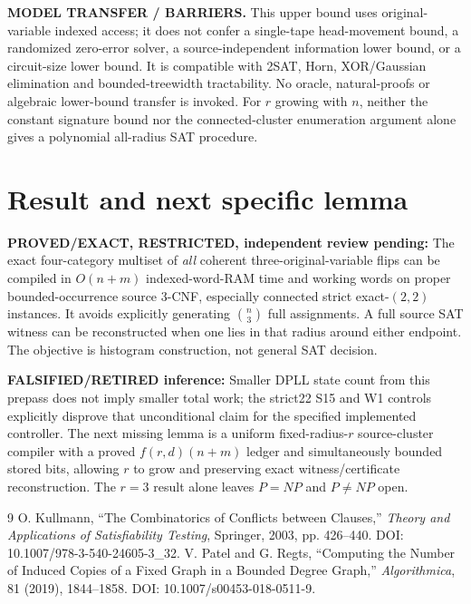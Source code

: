 \documentclass[11pt]{article}
\begin{document}
\noindent\textbf{MODEL TRANSFER / BARRIERS.} This upper bound uses original-variable indexed access; it does not confer a single-tape head-movement bound, a randomized zero-error solver, a source-independent information lower bound, or a circuit-size lower bound. It is compatible with 2SAT, Horn, XOR/Gaussian elimination and bounded-treewidth tractability. No oracle, natural-proofs or algebraic lower-bound transfer is invoked. For $r$ growing with $n$, neither the constant signature bound nor the connected-cluster enumeration argument alone gives a polynomial all-radius SAT procedure.

\section{Result and next specific lemma}
\noindent\textbf{PROVED/EXACT, RESTRICTED, independent review pending:} The exact four-category multiset of \emph{all} coherent three-original-variable flips can be compiled in $O(n+m)$ indexed-word-RAM time and working words on proper bounded-occurrence source 3-CNF, especially connected strict exact-$(2,2)$ instances. It avoids explicitly generating $\binom n3$ full assignments. A full source SAT witness can be reconstructed when one lies in that radius around either endpoint. The objective is histogram construction, not general SAT decision.

\noindent\textbf{FALSIFIED/RETIRED inference:} Smaller DPLL state count from this prepass does not imply smaller total work; the strict22 S15 and W1 controls explicitly disprove that unconditional claim for the specified implemented controller. The next missing lemma is a uniform fixed-radius-$r$ source-cluster compiler with a proved $f(r,d)(n+m)$ ledger and simultaneously bounded stored bits, allowing $r$ to grow and preserving exact witness/certificate reconstruction. The $r=3$ result alone leaves $P=NP$ and $P\ne NP$ open.

\begin{thebibliography}{9}
 O. Kullmann, ``The Combinatorics of Conflicts between Clauses,'' \emph{Theory and Applications of Satisfiability Testing}, Springer, 2003, pp. 426--440. DOI: 10.1007/978-3-540-24605-3\_32.
 V. Patel and G. Regts, ``Computing the Number of Induced Copies of a Fixed Graph in a Bounded Degree Graph,'' \emph{Algorithmica}, 81 (2019), 1844--1858. DOI: 10.1007/s00453-018-0511-9.
\end{thebibliography}
\end{document}

